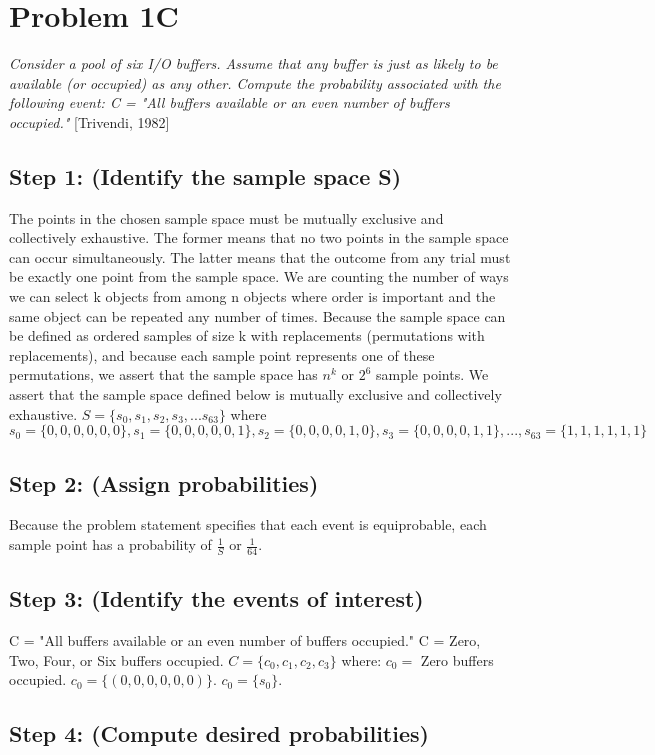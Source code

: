 \documentclass[a4paper,10pt]{article}
\title{}
\author{Mark Johnson \\
Loyola University Chicago}
\date {mjohnson4@luc.edu}
\begin{document}
\maketitle

\section{Problem 1C}
\emph{Consider a pool of six I/O buffers. Assume that any buffer is just as likely to be available (or occupied) as 
any other. Compute the probability associated with the following event: \newline
C = "All buffers available or an even number of buffers occupied."} [Trivendi, 1982]
\subsection{Step 1: (Identify the sample space S)}
The points in the chosen sample space must be mutually exclusive and collectively exhaustive. The former means that 
no two points in the sample space can occur simultaneously. The latter means that the outcome from any trial must be 
exactly one point from the sample space. We are counting the number of ways we can select k objects from among n 
objects where order is important and the same object can be repeated any number of times. Because the sample space 
can be defined as ordered samples of size k with replacements (permutations with replacements), and because each 
sample point represents one of these permutations, we assert that the sample space has $ n^{k} $ or $ 2^{6} $ sample 
points. We assert that the sample space defined below is mutually exclusive and collectively exhaustive. \newline
$ S = \{ s_{0}, s_{1}, s_{2}, s_{3},...s_{63} \} $ where \newline
$ s_{0} = \{0,0,0,0,0,0\}, s_{1} = \{0,0,0,0,0,1\}, s_{2} = \{0,0,0,0,1,0\}, s_{3} = \{0,0,0,0,1,1\},...,s_{63} = 
\{1,1,1,1,1,1\} $

\subsection{Step 2: (Assign probabilities)}
Because the problem statement specifies that each event is equiprobable, each sample point has a probability of $ 
\frac{1}{S} $ or $ \frac{1}{64} $.

\subsection{Step 3: (Identify the events of interest)}
C = "All buffers available or an even number of buffers occupied." \newline
C = Zero, Two, Four, or Six buffers occupied. \newline
$ C = \{c_{0}, c_{1}, c_{2}, c_{3}\} $ where: \newline
$ c_{0} = $ Zero buffers occupied.
$ c_{0} = \{(0,0,0,0,0,0)\}. $
$ c_{0} = \{s_{0}\}. $


\subsection{Step 4: (Compute desired probabilities)}
\end{document}
